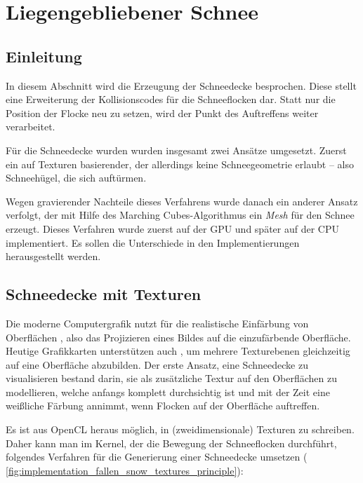 \section{Liegengebliebener Schnee}
\label{sec:fallen_snow}

\subsection{Einleitung}

In diesem Abschnitt wird die Erzeugung der Schneedecke
besprochen. Diese stellt eine Erweiterung der Kollisionscodes für die
Schneeflocken dar. Statt nur die Position der Flocke neu zu setzen,
wird der Punkt des Auftreffens weiter verarbeitet.

Für die Schneedecke wurden wurden insgesamt zwei Ansätze
umgesetzt. Zuerst ein auf Texturen basierender, der allerdings keine
Schneegeometrie erlaubt -- also Schneehügel, die sich auftürmen.

Wegen gravierender Nachteile dieses Verfahrens wurde danach ein
anderer Ansatz verfolgt, der mit Hilfe des Marching Cubes-Algorithmus
ein \emph{Mesh} für den Schnee erzeugt. Dieses Verfahren wurde zuerst
auf der GPU und später auf der CPU implementiert. Es sollen die
Unterschiede in den Implementierungen herausgestellt werden.

\subsection{Schneedecke mit Texturen}

Die moderne Computergrafik nutzt für die realistische Einfärbung von
Oberflächen , also das Projizieren
eines Bildes auf die einzufärbende Oberfläche. Heutige Grafikkarten
unterstützen auch , um mehrere
Texturebenen gleichzeitig auf eine Oberfläche abzubilden. Der erste
Ansatz, eine Schneedecke zu visualisieren bestand darin, sie als
zusätzliche Textur auf den Oberflächen zu modellieren, welche anfangs
komplett durchsichtig ist und mit der Zeit eine weißliche Färbung
annimmt, wenn Flocken auf der Oberfläche auftreffen.

Es ist aus OpenCL heraus möglich, in (zweidimensionale) Texturen zu
schreiben. Daher kann man im Kernel, der die Bewegung der
Schneeflocken durchführt, folgendes Verfahren für die Generierung
einer Schneedecke umsetzen (\Pimiddyvgl
\autoref{fig:implementation_fallen_snow_textures_principle}):

